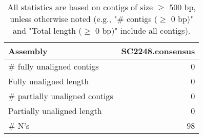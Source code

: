 \documentclass[12pt,a4paper]{article}
\begin{document}
\begin{table}[ht]
\begin{center}
\caption{All statistics are based on contigs of size $\geq$ 500 bp, unless otherwise noted (e.g., "\# contigs ($\geq$ 0 bp)" and "Total length ($\geq$ 0 bp)" include all contigs).}
\begin{tabular}{|l*{1}{|r}|}
\hline
Assembly & SC2248.consensus \\ \hline
\# fully unaligned contigs & 0 \\ \hline
Fully unaligned length & 0 \\ \hline
\# partially unaligned contigs & 0 \\ \hline
Partially unaligned length & 0 \\ \hline
\# N's & 98 \\ \hline
\end{tabular}
\end{center}
\end{table}
\end{document}

